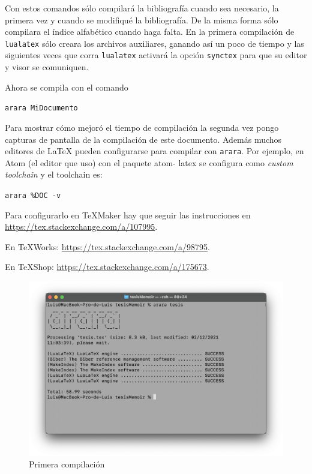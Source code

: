Con estos comandos sólo compilará la bibliografía cuando sea necesario, la
primera vez y cuando se modifiqué la bibliografía. De la misma forma sólo
compilara el índice alfabético cuando haga falta. En la primera compilación
de \texttt{lualatex} sólo creara los archivos auxiliares, ganando así un
poco de tiempo y las siguientes veces que corra \texttt{lualatex} activará
la opción \texttt{synctex} para que su editor y visor se comuniquen.

Ahora se compila con el comando
\begin{flushleft}
  \verb|arara MiDocumento|
\end{flushleft}
Para mostrar cómo mejoró el tiempo de compilación la segunda
vez pongo capturas de pantalla de la compilación de este documento.
Además muchos editores de \LaTeX{} pueden configurarse para compilar con
\texttt{arara}.  Por ejemplo, en Atom (el editor que uso) con el paquete atom-
latex se configura como \textit{custom toolchain} y el toolchain es:
\begin{flushleft}
  \verb|arara %DOC -v|
\end{flushleft}

Para configurarlo en TeXMaker hay que seguir las instrucciones en
\url{https://tex.stackexchange.com/a/107995}.

En TeXWorks: \url{https://tex.stackexchange.com/a/98795}.

En TeXShop: \url{https://tex.stackexchange.com/a/175673}.

\clearpage

\begin{figure}
\centering
  \includegraphics[scale=0.3]{primera}
  \caption{Primera compilación}
\end{figure}

